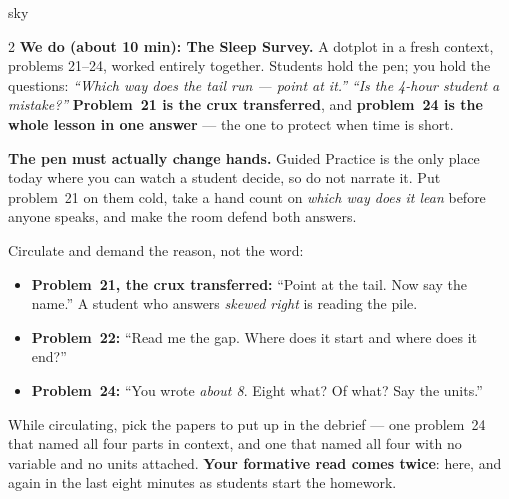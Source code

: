 \documentclass[10pt]{article}
\begin{document}
\begin{skillbox}{sky}
\begin{multicols}{2}
\columnbreak
\textbf{We do (about 10 min): The Sleep Survey.} A dotplot in a fresh context, problems 21--24,
worked entirely together. Students hold the pen; you hold the questions: \emph{``Which way does
the tail run --- point at it.''} \quad \emph{``Is the 4-hour student a mistake?''}
\textbf{Problem~21 is the crux transferred}, and \textbf{problem~24 is the whole lesson in one
answer} --- the one to protect when time is short.

\textbf{The pen must actually change hands.} Guided Practice is the only place today where you
can watch a student decide, so do not narrate it. Put problem~21 on them cold, take a hand count
on \emph{which way does it lean} before anyone speaks, and make the room defend both answers.

Circulate and demand the reason, not the word:
\begin{itemize}[leftmargin=1.1em, nosep]
  \item \textbf{Problem~21, the crux transferred:} ``Point at the tail. Now say the name.'' A
        student who answers \emph{skewed right} is reading the pile.
  \item \textbf{Problem~22:} ``Read me the gap. Where does it start and where does it end?''
  \item \textbf{Problem~24:} ``You wrote \emph{about 8}. Eight what? Of what? Say the units.''
\end{itemize}
While circulating, pick the papers to put up in the debrief --- one problem~24 that named all
four parts in context, and one that named all four with no variable and no units attached.
\textbf{Your formative read comes twice}: here, and again in the last eight minutes as students
start the homework.
\end{multicols}
\end{skillbox}
\end{document}
